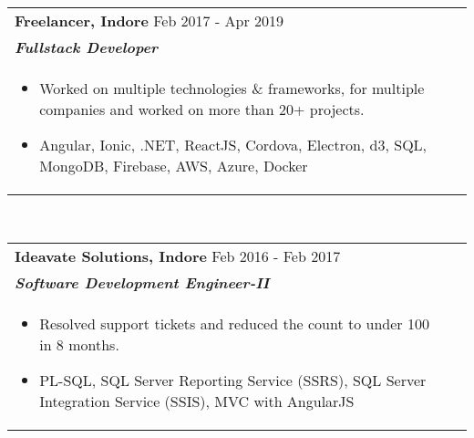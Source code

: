 \documentclass[a4paper,20pt]{article}
\begin{document}
\begin{tabularx}{\linewidth}{ @{}l r@{} }
    \color[HTML]{1C033C} \textbf{Freelancer, Indore} \hfill \color[HTML]{371e77} Feb 2017 - Apr 2019 \\[4pt]
    \color[HTML]{371e77}\textbf{\textit{Fullstack Developer}} \hfill \color[HTML]{4B28A4}            \\[5pt]
    \begin{minipage}[t]{\linewidth}
        \begin{itemize}[nosep,after=\strut, leftmargin=2em, itemsep=2pt]
            \item Worked on multiple technologies \& frameworks, for multiple companies and worked on more than 20+ projects.
            \item Angular, Ionic, .NET, ReactJS, Cordova, Electron, d3, SQL, MongoDB, Firebase, AWS, Azure, Docker
        \end{itemize}
    \end{minipage}
\end{tabularx}\\[3pt]

\begin{tabularx}{\linewidth}{ @{}l r@{} }
    \color[HTML]{1C033C} \textbf{Ideavate Solutions, Indore} \hfill \color[HTML]{371e77} Feb 2016 - Feb 2017 \\[4pt]
    \color[HTML]{371e77}\textbf{\textit{Software Development Engineer-II}} \hfill \color[HTML]{4B28A4}       \\[5pt]
    \begin{minipage}[t]{\linewidth}
        \begin{itemize}[nosep,after=\strut, leftmargin=2em, itemsep=2pt]
            \item Resolved support tickets and reduced the count to under 100 in 8 months.
            \item PL-SQL, SQL Server Reporting Service (SSRS), SQL Server Integration Service (SSIS), MVC with AngularJS
        \end{itemize}
    \end{minipage}
\end{tabularx}\\[3pt]
\end{document}
